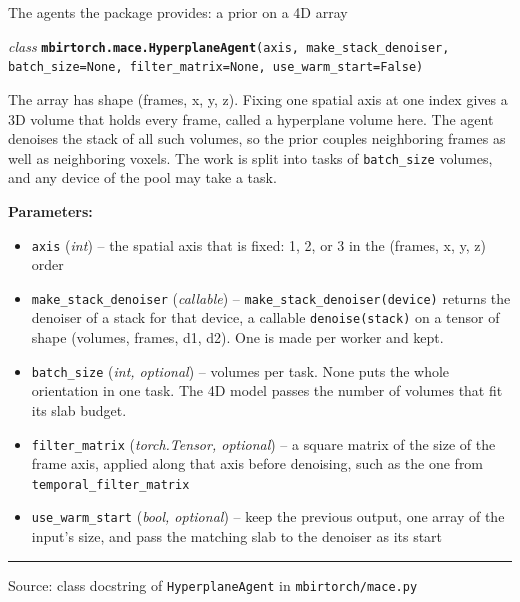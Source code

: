 \documentclass[aspectratio=169,10pt]{beamer}
\newcommand{\tagchip}[2]{{\setlength{\fboxsep}{2.5pt}\setlength{\fboxrule}{0.6pt}%
  \fcolorbox{white}{#1}{\textcolor{white}{\footnotesize\bfseries\strut #2}}}}
\newcommand{\macechip}{\tagchip{planAccent}{MACE}}
\newcommand{\footnoteline}[1]{%
  \savebox{\notebox}{\begin{minipage}[b]{0.94\linewidth}\raggedright
    {\footnotesize\textcolor{inkGray}{#1}}\end{minipage}}%
  {\color{planAccent}\rule[-\dp\notebox]{2pt}{\dimexpr\ht\notebox+\dp\notebox\relax}}%
  \hspace{6pt}\usebox{\notebox}}
\newcommand{\source}[1]{\par\vfill{\scriptsize\textcolor{inkGray}{Source: #1}\par}}
\newcommand{\sig}[3]{\begin{sigbox}\raggedright\scriptsize\hangindent=14pt\hangafter=1
  \textit{#1} \texttt{\textbf{#2}(#3)}\end{sigbox}}
\newenvironment{params}{\par{\scriptsize\textbf{Parameters:}}\par\vspace{-6pt}%
  \begin{itemize}\scriptsize\setlength{\itemsep}{0pt}\setlength{\topsep}{0pt}}{\end{itemize}\vspace{-2pt}}
\newcommand{\param}[3]{\item \texttt{#1} (\textit{#2}) -- #3}
\newcommand{\sigtext}[1]{{\scriptsize #1\par}}
\begin{document}
\begin{frame}{The agents the package provides: a prior on a 4D array \hfill \macechip}
  \vspace{2pt}
  \sig{class}{mbirtorch.mace.HyperplaneAgent}{axis, make\_stack\_denoiser, batch\_size=None, filter\_matrix=None, use\_warm\_start=False}
  \sigtext{The array has shape (frames, x, y, z).  Fixing one spatial
  axis at one index gives a 3D volume that holds every frame, called a
  hyperplane volume here.  The agent denoises the stack of all such volumes,
  so the prior couples neighboring frames as well as neighboring voxels.
  The work is split into tasks of \texttt{batch\_size} volumes, and any
  device of the pool may take a task.}
  \begin{params}
    \param{axis}{int}{the spatial axis that is fixed: 1, 2, or 3 in the (frames, x, y, z) order}
    \param{make\_stack\_denoiser}{callable}{\texttt{make\_stack\_denoiser(device)} returns the denoiser of a stack for that device, a callable \texttt{denoise(stack)} on a tensor of shape (volumes, frames, d1, d2).  One is made per worker and kept.}
    \param{batch\_size}{int, optional}{volumes per task.  None puts the whole orientation in one task.  The 4D model passes the number of volumes that fit its slab budget.}
    \param{filter\_matrix}{torch.Tensor, optional}{a square matrix of the size of the frame axis, applied along that axis before denoising, such as the one from \texttt{temporal\_filter\_matrix}}
    \param{use\_warm\_start}{bool, optional}{keep the previous output, one array of the input's size, and pass the matching slab to the denoiser as its start}
  \end{params}
  \vfill
  \footnoteline{Each of the three agents needs a model on one device.  A
  model on several devices returns its output divided across them, which
  the loop cannot add into one array, so the agent refuses it with a named
  error.}
  \source{class docstring of \texttt{HyperplaneAgent} in \texttt{mbirtorch/mace.py}}
\end{frame}
\end{document}
